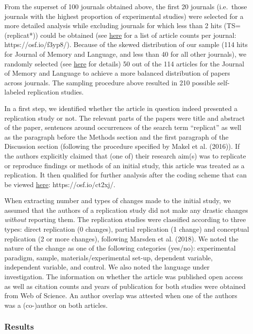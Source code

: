 \documentclass[]{elsarticle} %
\begin{document}
From the superset of 100 journals obtained above, the first 20 journals
(i.e.~those journals with the highest proportion of experimental
studies) were selected for a more detailed analysis while excluding
journals for which less than 2 hits (TS=(replicat*)) could be obtained
(see \href{https://osf.io/f3yp8/}{here} for a list of article counts per
journal: https://osf.io/f3yp8/). Because of the skewed distribution of
our sample (114 hits for Journal of Memory and Language, and less than
40 for all other journals), we randomly selected (see
\href{https://osf.io/6vfpe/}{here} for details) 50 out of the 114
articles for the Journal of Memory and Language to achieve a more
balanced distribution of papers across journals. The sampling procedure
above resulted in 210 possible self-labeled replication studies.

In a first step, we identified whether the article in question indeed
presented a replication study or not. The relevant parts of the papers
were title and abstract of the paper, sentences around occurrences of
the search term ``replicat'' as well as the paragraph before the Methods
section and the first paragraph of the Discussion section (following the
procedure specified by Makel et al. (2016)). If the authors explicitly
claimed that (one of) their research aim(s) was to replicate or
reproduce findings or methods of an initial study, this article was
treated as a replication. It then qualified for further analysis after
the coding scheme that can be viewed \href{https://osf.io/ct2xj/}{here}:
https://osf.io/ct2xj/.

When extracting number and types of changes made to the initial study,
we assumed that the authors of a replication study did not make any
drastic changes \emph{without} reporting them. The replication studies
were classified according to three types: direct replication (0
changes), partial replication (1 change) and conceptual replication (2
or more changes), following Marsden et al. (2018). We noted the nature
of the change as one of the following categories (yes/no): experimental
paradigm, sample, materials/experimental set-up, dependent variable,
independent variable, and control. We also noted the language under
investigation. The information on whether the article was published open
access as well as citation counts and years of publication for both
studies were obtained from Web of Science. An author overlap was
attested when one of the authors was a (co-)author on both articles.

\hypertarget{results-1}{%
\subsubsection{Results}\label{results-1}}
\end{document}
